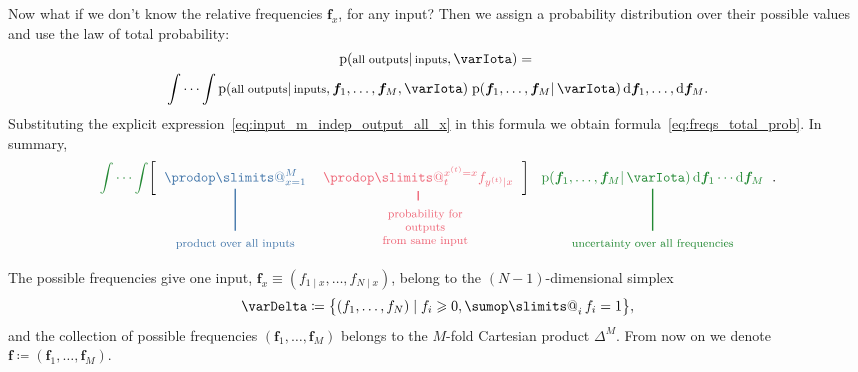 \documentclass[\ifafour a4paper,12pt,\else a5paper,10pt,\fi%
onecolumn,oneside,article,%
british%
]{memoir}
\makeatletter
\theoremstyle{remark}
\theoremstyle{innote}
\def\sum{\DOTSI\sumop\slimits@}
\def\prod{\DOTSI\prodop\slimits@}
\newcommand*{\di}{\mathrm{d}}%
\newcommand*{\defd}{\coloneqq}
\newcommand*{\suchthat}{\mid}%
\renewcommand{\ge}{\geqslant}%
\DeclarePairedDelimiter\set{\{}{\}}
\newcommand*{\pf}{\mathrm{p}}%
\renewcommand*{\|}{\mathpunct{|}}
\newcommand*{\tsum}{\mathop{\textstyle\sum}\nolimits}
\newcommand{\explanation}[4][t]{%
\begin{tabular}[#1]{c}#2\\[0.5\jot]\rule{1pt}{#3}\\#4\end{tabular}}%
\newcommand*{\yI}{\varIota}
\newcommand*{\yf}{\bm{f}}
\newcommand*{\xo}[1]{x^{(#1)}}
\newcommand*{\yo}[1]{y^{(#1)}}
\makeatother
\begin{document}
Now what if we don't know the relative frequencies $\yf_x$, for any input?
Then we assign a probability distribution over their possible values%
and use the law of total probability:
\begin{multline}
  \label{eq:freqs_total_prob}
  \pf(\text{\footnotesize all outputs} \|\text{\footnotesize inputs}, \yI) ={}\\
  \idotsint \pf(\text{\footnotesize all outputs} \|\text{\footnotesize inputs},
  \yf_1,\dotsc,\yf_M, \yI)
  \; \pf(\yf_1,\dotsc,\yf_M \| \yI)\,\di\yf_1,\dotsc,\di\yf_M.
\end{multline}
Substituting the explicit expression~\eqref{eq:input_m_indep_output_all_x}
in this formula we obtain formula~\eqref{eq:freqs_total_prob}. In summary,
\begin{equation}
  \label{eq:prob_several_pairs_exch_explanation}
  \textcolor{mygreen}{\idotsint}
  \biggl[ \textcolor{mypurpleblue}{\explanation{$\displaystyle\prod_{x=1}^M$}{3em}{\clap{\parbox{10em}{\centering\footnotesize product over all inputs}}}} \textcolor{myred}{\explanation{$\smash{\displaystyle\prod_t^{\xo{t}=x} f_{\yo{t}\|x}}$}{0.67em}{\clap{\quad\parbox[t]{8em}{\centering\footnotesize probability for outputs\\from same input}}}} \biggr]
  \;
  \textcolor{mygreen}{\explanation{$\pf(\yf_1,\dotsc,\yf_M \| \yI)
    \,\di\yf_1 \dotsm \di\yf_M$}{3em}{\clap{\parbox{12em}{\centering\footnotesize uncertainty over all frequencies}}}}.
\end{equation}


The possible frequencies give one input,
$\yf_x \equiv (f_{1\|x}, \dotsc, f_{N\|x})$, belong to the
$(N-1)$-dimensional simplex
\begin{equation}
  \label{eq:simplex_N}
  \varDelta \defd \set[\big]{(f_1, \dotsc,f_N) \suchthat f_i \ge 0, \tsum_i f_i =1},
\end{equation}
and the collection of possible frequencies $(\yf_1,\dotsc, \yf_M)$ belongs
to the $M$-fold Cartesian product $\varDelta^M$. From now on we denote
$\yf \defd (\yf_1,\dotsc,\yf_M)$.

\bigskip
\end{document}
